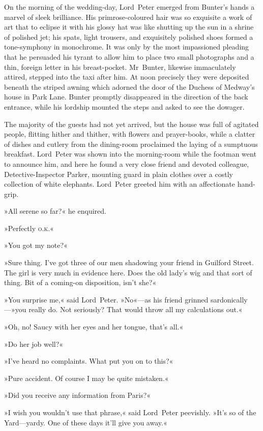\divider
On the morning of the wedding-day, Lord~Peter emerged from Bunter's hands a marvel of sleek brilliance. His primrose-coloured hair was so exquisite a work of art that to eclipse it with his glossy hat was like shutting up the sun in a shrine of polished jet; his spats, light trousers, and exquisitely polished shoes formed a tone-symphony in monochrome. It was only by the most impassioned pleading that he persuaded his tyrant to allow him to place two small photographs and a thin, foreign letter in his breast-pocket. Mr~Bunter, likewise immaculately attired, stepped into the taxi after him. At noon precisely they were deposited beneath the striped awning which adorned the door of the Duchess of Medway's house in Park Lane. Bunter promptly disappeared in the direction of the back entrance, while his lordship mounted the steps and asked to see the dowager.

The majority of the guests had not yet arrived, but the house was full of agitated people, flitting hither and thither, with flowers and prayer-books, while a clatter of dishes and cutlery from the dining-room proclaimed the laying of a sumptuous breakfast. Lord~Peter was shown into the morning-room while the footman went to announce him, and here he found a very close friend and devoted colleague, Detective-Inspector Parker, mounting guard in plain clothes over a costly collection of white elephants. Lord~Peter greeted him with an affectionate hand-grip.

»All serene so far?« he enquired.

»Perfectly \textsc{o.k.}«

»You got my note?«

»Sure thing. I've got three of our men shadowing your friend in Guilford Street. The girl is very much in evidence here. Does the old lady's wig and that sort of thing. Bit of a coming-on disposition, isn't she?«

»You surprise me,« said Lord~Peter. »No«—as his friend grinned sardonically—»you really do. Not seriously? That would throw all my calculations out.«

»Oh, no! Saucy with her eyes and her tongue, that's all.«

»Do her job well?«

»I've heard no complaints. What put you on to this?«

»Pure accident. Of course I may be quite mistaken.«

»Did you receive any information from Paris?«

»I wish you wouldn't use that phrase,« said Lord~Peter peevishly. »It's so of the Yard—yardy. One of these days it'll give you away.«

